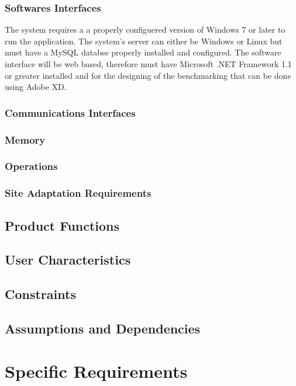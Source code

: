 \documentclass[a4paper,12pt]{article}
\begin{document}
\subsubsection{Softwares Interfaces}
The system requires a a properly configuered version of Windows 7 or later to run the application. The system's server can either be Windows or Linux but must have a MySQL databse properly installed and configured. The software interface will be web based, therefore must have Microsoft .NET Framework 1.1 or greater installed and for the designing of the benchmarking that can be done using Adobe XD.

\subsubsection{Communications Interfaces}

\subsubsection{Memory}

\subsubsection{Operations}

\subsubsection{Site Adaptation Requirements}

\subsection{Product Functions}

\subsection{User Characteristics}

\subsection{Constraints}

\subsection{Assumptions and Dependencies}

\section{Specific Requirements}
\end{document}
